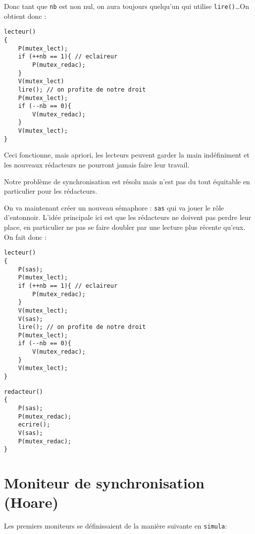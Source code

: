 \documentclass[12pt,a4paper]{report}
\begin{document}
Donc tant que \verb?nb? est non nul, on aura toujours quelqu'un qui utilise \verb?lire()?\dots On obtient donc :

\medskip

\begin{center}
  \begin{verbatim}
lecteur()
{
    P(mutex_lect);
    if (++nb == 1){ // eclaireur
        P(mutex_redac);
    }
    V(mutex_lect)
    lire(); // on profite de notre droit
    P(mutex_lect);
    if (--nb == 0){
        V(mutex_redac);
    }
    V(mutex_lect);
}
\end{verbatim}
\end{center}

Ceci fonctionne, mais apriori, les lecteurs peuvent garder la main indéfiniment et les nouveaux rédacteurs ne pourront jamais faire leur travail.

Notre problème de synchronisation est résolu mais n'est pas du tout équitable en particulier pour les rédacteurs.

On va maintenant créer un nouveau sémaphore : \verb?sas? qui va jouer le rôle d'entonnoir. L'idée principale ici est que les rédacteurs ne doivent \og pas perdre leur place\fg{}, en particulier ne pas se faire doubler par une lecture plus récente qu'eux. On fait donc :

\medskip

\begin{minipage}{0.6\linewidth}
\begin{verbatim}
lecteur()
{
    P(sas);
    P(mutex_lect);
    if (++nb == 1){ // eclaireur
        P(mutex_redac);
    }
    V(mutex_lect);
    V(sas);
    lire(); // on profite de notre droit
    P(mutex_lect);
    if (--nb == 0){
        V(mutex_redac);
    }
    V(mutex_lect);
}
\end{verbatim}
\end{minipage}
\begin{minipage}{0.4\linewidth}
\begin{verbatim}
redacteur()
{
    P(sas);
    P(mutex_redac);
    ecrire();
    V(sas);
    P(mutex_redac);
}
\end{verbatim}
\end{minipage}


\section{Moniteur de synchronisation (Hoare)}

Les premiers moniteurs se définissaient de la manière suivante en \texttt{simula}:
\end{document}
